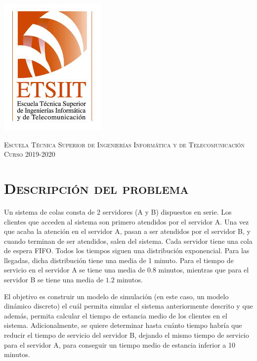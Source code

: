 \documentclass[11pt,a4paper]{article}
\begin{document}
\begin{titlepage}
\begin{minipage}{\textwidth}
\includegraphics[scale=0.3]{img/etsiit.jpeg}

\vspace{0.7cm}
\textsc{Escuela Técnica Superior de Ingenierías Informática y de Telecomunicación}\\
\vspace{1cm}
\textsc{Curso 2019-2020}
\end{minipage}
\end{titlepage}

\tableofcontents
\thispagestyle{empty}				%

\newpage

\setlength{\parskip}{1em}

\section{\textsc{Descripción del problema}}

Un sistema de colas consta de 2 servidores (A y B) dispuestos en serie. Los clientes
que acceden al sistema son primero atendidos por el servidor A. Una vez que acaba
la atención en el servidor A, pasan a ser atendidos por el servidor B, y cuando terminan
de ser atendidos, salen del sistema. Cada servidor tiene una cola de espera FIFO. Todos
los tiempos siguen una distribución exponencial. Para las llegadas, dicha distribución tiene
una media de 1 minuto. Para el tiempo de servicio en el servidor A se tiene una media de $0.8$
minutos, mientras que para el servidor B se tiene una media de $1.2$ minutos.

El objetivo es construir un modelo de simulación (en este caso, un modelo dinámico discreto)
el cuál permita simular el sistema anteriormente descrito y que además, permita calcular el tiempo de estancia
medio de los clientes en el sistema. Adicionalmente, se quiere determinar hasta cuánto tiempo
habría que reducir el tiempo de servicio del servidor B, dejando el mismo tiempo de servicio para el servidor
A, para conseguir un tiempo medio de estancia inferior a 10 minutos.
\end{document}
